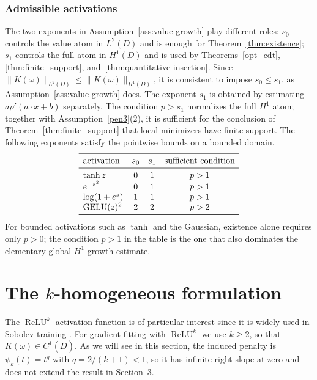 \documentclass[11pt]{amsart}
\theoremstyle{definition}
\theoremstyle{remark}
\DeclareMathOperator{\relu}{ReLU}
\newcommand{\reluk}{\relu^{k}}
\begin{document}
\subsubsection*{Admissible activations}
\label{sec:admissible}
The two exponents in Assumption~\ref{ass:value-growth} play different roles:
$s_0$ controls the value atom in
$L^2(D)$ and is enough for Theorem~\ref{thm:existence}; $s_1$ controls the
full atom in $H^1(D)$ and is used by Theorems~\ref{opt_cdt},
\ref{thm:finite_support}, and~\ref{thm:quantitative-insertion}. Since
$\|K(\omega)\|_{L^2(D)}\le\|K(\omega)\|_{H^1(D)}$, it is consistent to impose
$s_0\le s_1$, as Assumption~\ref{ass:value-growth} does. The exponent $s_1$ is obtained by estimating
$a\rho'(a\cdot x+b)$ separately. The condition
$p>s_1$ normalizes the full $H^1$ atom; together with
Assumption~\ref{pen3}(2), it is sufficient for the conclusion of
Theorem~\ref{thm:finite_support} that local minimizers have finite support. The following
exponents satisfy the pointwise bounds on a bounded domain.
\begin{equation*}
\begin{array}{lccc}
\toprule
\text{activation} & s_0 & s_1
& \text{sufficient condition}\\
\midrule
\tanh z              &0&1&p>1\\
e^{-z^2}             &0&1&p>1\\
\log(1+e^z)          &1&1&p>1\\
\mathrm{GELU}(z)^2    &2&2&p>2\\
\bottomrule
\end{array}
\end{equation*}
For bounded activations such as $\tanh$ and the Gaussian, existence alone
requires only $p > 0$; the condition $p > 1$ in the table is the one that also
dominates the elementary global $H^1$ growth estimate.



\section{The \texorpdfstring{$k$}{k}-homogeneous formulation}

The $\reluk$ activation function is of particular interest since it is widely used in Sobolev training \cite{li2024twolayer,heeringa2024embeddings}.
For gradient fitting with $\reluk$ we use $k\ge2$, so that
$K(\omega)\in C^1(\overline D)$.
As we will see in this section, the induced penalty is $\psi_k(t)=t^q$ with
$q=2/(k+1)<1$, so it has infinite right slope at zero and does not
extend the result in Section~3.
\end{document}

